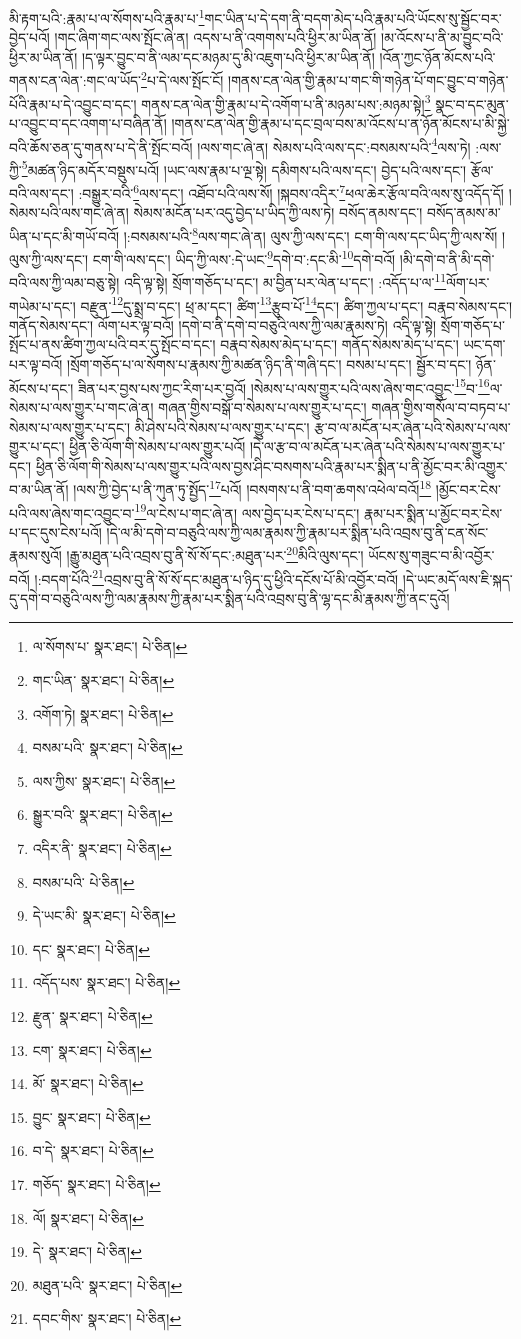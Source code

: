 མི་རྟག་པའི་:རྣམ་པ་ལ་སོགས་པའི་རྣམ་པ་\footnote{ལ་སོགས་པ་  སྣར་ཐང་།  པེ་ཅིན། }གང་ཡིན་པ་དེ་དག་ནི་བདག་མེད་པའི་རྣམ་པའི་ཡོངས་སུ་སྦྱོང་བར་བྱེད་པའོ། །གང་ཞིག་གང་ལས་སྤོང་ཞེ་ན། འདས་པ་ནི་འགགས་པའི་ཕྱིར་མ་ཡིན་ནོ། །མ་འོངས་པ་ནི་མ་བྱུང་བའི་ཕྱིར་མ་ཡིན་ནོ། །ད་ལྟར་བྱུང་བ་ནི་ལམ་དང་མཉམ་དུ་མི་འཇུག་པའི་ཕྱིར་མ་ཡིན་ནོ། །འོན་ཀྱང་ཉོན་མོངས་པའི་གནས་ངན་ལེན་:གང་ལ་ཡོད་\footnote{གང་ཡིན་  སྣར་ཐང་།  པེ་ཅིན། }པ་དེ་ལས་སྤོང་ངོ། །གནས་ངན་ལེན་གྱི་རྣམ་པ་གང་གི་གཉེན་པོ་གང་བྱུང་བ་གཉེན་པོའི་རྣམ་པ་དེ་འབྱུང་བ་དང་། གནས་ངན་ལེན་གྱི་རྣམ་པ་དེ་འགོག་པ་ནི་མཉམ་པས་:མཉམ་སྟེ།\footnote{འགོག་ཏེ།  སྣར་ཐང་།  པེ་ཅིན། } སྣང་བ་དང་མུན་པ་འབྱུང་བ་དང་འགག་པ་བཞིན་ནོ། །གནས་ངན་ལེན་གྱི་རྣམ་པ་དང་བྲལ་བས་མ་འོངས་པ་ན་ཉོན་མོངས་པ་མི་སྐྱེ་བའི་ཆོས་ཅན་དུ་གནས་པ་དེ་ནི་སྤོང་བའོ། །ལས་གང་ཞེ་ན། སེམས་པའི་ལས་དང་:བསམས་པའི་\footnote{བསམ་པའི་  སྣར་ཐང་།  པེ་ཅིན། }ལས་ཏེ། :ལས་ཀྱི་\footnote{ལས་ཀྱིས་  སྣར་ཐང་།  པེ་ཅིན། }མཚན་ཉིད་མདོར་བསྡུས་པའོ། །ཡང་ལས་རྣམ་པ་ལྔ་སྟེ། དམིགས་པའི་ལས་དང་། བྱེད་པའི་ལས་དང་། རྩོལ་བའི་ལས་དང་། :བསྒྱུར་བའི་\footnote{སྒྱུར་བའི་  སྣར་ཐང་།  པེ་ཅིན། }ལས་དང་། འཐོབ་པའི་ལས་སོ། །སྐབས་འདིར་\footnote{འདིར་ནི་  སྣར་ཐང་།  པེ་ཅིན། }ཕལ་ཆེར་རྩོལ་བའི་ལས་སུ་འདོད་དོ། །སེམས་པའི་ལས་གང་ཞེ་ན། སེམས་མངོན་པར་འདུ་བྱེད་པ་ཡིད་ཀྱི་ལས་ཏེ། བསོད་ནམས་དང་། བསོད་ནམས་མ་ཡིན་པ་དང་མི་གཡོ་བའོ། །:བསམས་པའི་\footnote{བསམ་པའི་  པེ་ཅིན། }ལས་གང་ཞེ་ན། ལུས་ཀྱི་ལས་དང་། ངག་གི་ལས་དང་ཡིད་ཀྱི་ལས་སོ། །ལུས་ཀྱི་ལས་དང་། ངག་གི་ལས་དང་། ཡིད་ཀྱི་ལས་:དེ་ཡང་\footnote{དེ་ཡང་མི་  སྣར་ཐང་།  པེ་ཅིན། }དགེ་བ་:དང་མི་\footnote{དང་  སྣར་ཐང་།  པེ་ཅིན། }དགེ་བའོ། །མི་དགེ་བ་ནི་མི་དགེ་བའི་ལས་ཀྱི་ལམ་བཅུ་སྟེ། འདི་ལྟ་སྟེ། སྲོག་གཅོད་པ་དང་། མ་བྱིན་པར་ལེན་པ་དང་། :འདོད་པ་ལ་\footnote{འདོད་པས་  སྣར་ཐང་།  པེ་ཅིན། }ལོག་པར་གཡེམ་པ་དང་། བརྫུན་\footnote{རྫུན་  སྣར་ཐང་།  པེ་ཅིན། }དུ་སྨྲ་བ་དང་། ཕྲ་མ་དང་། ཚིག་\footnote{ངག་  སྣར་ཐང་།  པེ་ཅིན། }རྩུབ་པོ་\footnote{མོ་  སྣར་ཐང་།  པེ་ཅིན། }དང་། ཚིག་ཀྱལ་པ་དང་། བརྣབ་སེམས་དང་། གནོད་སེམས་དང་། ལོག་པར་ལྟ་བའོ། །དགེ་བ་ནི་དགེ་བ་བཅུའི་ལས་ཀྱི་ལམ་རྣམས་ཏེ། འདི་ལྟ་སྟེ། སྲོག་གཅོད་པ་སྤོང་པ་ནས་ཚིག་ཀྱལ་པའི་བར་དུ་སྤོང་བ་དང་། བརྣབ་སེམས་མེད་པ་དང་། གནོད་སེམས་མེད་པ་དང་། ཡང་དག་པར་ལྟ་བའོ། །སྲོག་གཅོད་པ་ལ་སོགས་པ་རྣམས་ཀྱི་མཚན་ཉིད་ནི་གཞི་དང་། བསམ་པ་དང་། སྦྱོར་བ་དང་། ཉོན་མོངས་པ་དང་། ཟིན་པར་བྱས་པས་ཀྱང་རིག་པར་བྱའོ། །སེམས་པ་ལས་གྱུར་པའི་ལས་ཞེས་གང་འབྱུང་\footnote{བྱུང་  སྣར་ཐང་།  པེ་ཅིན། }བ་\footnote{བ་དེ་  སྣར་ཐང་།  པེ་ཅིན། }ལ་སེམས་པ་ལས་གྱུར་པ་གང་ཞེ་ན། གཞན་གྱིས་བསྒོ་བ་སེམས་པ་ལས་གྱུར་པ་དང་། གཞན་གྱིས་གསོལ་བ་བཏབ་པ་སེམས་པ་ལས་གྱུར་པ་དང་། མི་ཤེས་པའི་སེམས་པ་ལས་གྱུར་པ་དང་། རྩ་བ་ལ་མངོན་པར་ཞེན་པའི་སེམས་པ་ལས་གྱུར་པ་དང་། ཕྱིན་ཅི་ལོག་གི་སེམས་པ་ལས་གྱུར་པའོ། །དེ་ལ་རྩ་བ་ལ་མངོན་པར་ཞེན་པའི་སེམས་པ་ལས་གྱུར་པ་དང་། ཕྱིན་ཅི་ལོག་གི་སེམས་པ་ལས་གྱུར་པའི་ལས་བྱས་ཤིང་བསགས་པའི་རྣམ་པར་སྨིན་པ་ནི་མྱོང་བར་མི་འགྱུར་བ་མ་ཡིན་ནོ། །ལས་ཀྱི་བྱེད་པ་ནི་ཀུན་ཏུ་སྤྱོད་\footnote{གཅོད་  སྣར་ཐང་།  པེ་ཅིན། }པའོ། །བསགས་པ་ནི་བག་ཆགས་འཕེལ་བའོ།\footnote{ལོ།  སྣར་ཐང་།  པེ་ཅིན། } །མྱོང་བར་ངེས་པའི་ལས་ཞེས་གང་འབྱུང་བ་\footnote{དེ་  སྣར་ཐང་།  པེ་ཅིན། }ལ་ངེས་པ་གང་ཞེ་ན། ལས་བྱེད་པར་ངེས་པ་དང་། རྣམ་པར་སྨིན་པ་མྱོང་བར་ངེས་པ་དང་དུས་ངེས་པའོ། །དེ་ལ་མི་དགེ་བ་བཅུའི་ལས་ཀྱི་ལམ་རྣམས་ཀྱི་རྣམ་པར་སྨིན་པའི་འབྲས་བུ་ནི་ངན་སོང་རྣམས་སུའོ། །རྒྱུ་མཐུན་པའི་འབྲས་བུ་ནི་སོ་སོ་དང་:མཐུན་པར་\footnote{མཐུན་པའི་  སྣར་ཐང་།  པེ་ཅིན། }མིའི་ལུས་དང་། ཡོངས་སུ་གཟུང་བ་མི་འབྱོར་བའོ། །:བདག་པོའི་\footnote{དབང་གིས་  སྣར་ཐང་།  པེ་ཅིན། }འབྲས་བུ་ནི་སོ་སོ་དང་མཐུན་པ་ཉིད་དུ་ཕྱིའི་དངོས་པོ་མི་འབྱོར་བའོ། །དེ་ཡང་མདོ་ལས་ཇི་སྐད་དུ་དགེ་བ་བཅུའི་ལས་ཀྱི་ལམ་རྣམས་ཀྱི་རྣམ་པར་སྨིན་པའི་འབྲས་བུ་ནི་ལྷ་དང་མི་རྣམས་ཀྱི་ནང་དུའོ། 